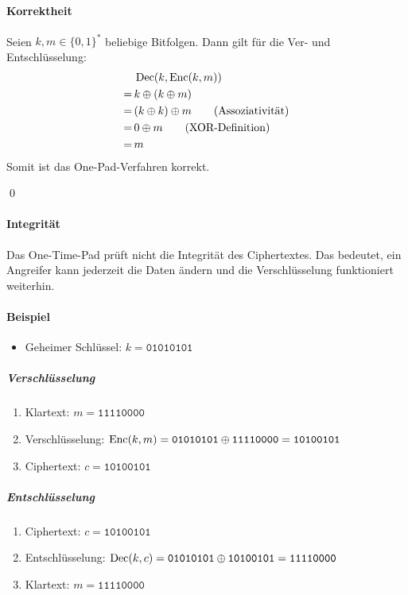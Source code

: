 				\paragraph{Korrektheit}
					Seien \( k, m \in \{ 0, 1 \} ^ * \) beliebige Bitfolgen. Dann gilt für die Ver- und Entschlüsselung:
					\begin{align*}
						  & \, \operatorname{Dec}(k, \operatorname{Enc}(k, m))                        \\
						= & \, k \oplus (k \oplus m)                      \\
						= & \, (k \oplus k) \oplus m \tag{Assoziativität} \\
						= & \, 0 \oplus m \tag{XOR-Definition}            \\
						= & \, m
					\end{align*}
					Somit ist das One-Pad-Verfahren korrekt.

					\qed

				\paragraph{Integrität}
					Das One-Time-Pad prüft nicht die Integrität des Ciphertextes. Das bedeutet, ein Angreifer kann jederzeit die Daten ändern und die Verschlüsselung funktioniert weiterhin.

				\paragraph{Beispiel}
					\begin{itemize}
						\item Geheimer Schlüssel: \( k = \texttt{01010101} \)
					\end{itemize}

					\subparagraph{Verschlüsselung}
						\begin{enumerate}
							\item[] Klartext: \( m = \texttt{11110000} \)
							\item Verschlüsselung: \( \operatorname{Enc}(k, m) = \texttt{01010101} \oplus \texttt{11110000} = \texttt{10100101} \)
							\item[] Ciphertext: \( c = \texttt{10100101} \)
						\end{enumerate}

					\subparagraph{Entschlüsselung}
						\begin{enumerate}
							\item[] Ciphertext: \( c = \texttt{10100101} \)
							\item Entschlüsselung: \( \operatorname{Dec}(k, c) = \texttt{01010101} \oplus \texttt{10100101} = \texttt{11110000} \)
							\item[] Klartext: \( m = \texttt{11110000} \)
						\end{enumerate}

